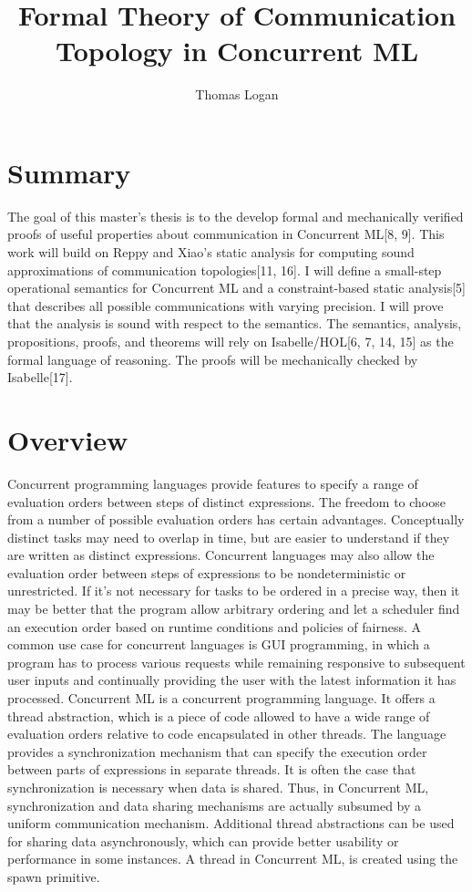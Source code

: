 \documentclass{article}
\title{Formal Theory of Communication Topology in Concurrent ML}
\author{Thomas Logan}
\begin{document}
\maketitle
{}

\newpage
{}


\section{Summary}
The goal of this master's thesis is to the develop formal and mechanically verified proofs of
useful properties about communication in Concurrent ML[8, 9].  This work will build on Reppy
and Xiao's static analysis for computing sound approximations of communication
topologies[11, 16].  I will define a small-step operational semantics for Concurrent ML and a
constraint-based static analysis[5] that describes all possible communications with varying
precision.  I will prove that the analysis is sound with respect to the semantics.  The
semantics, analysis, propositions, proofs, and theorems will rely on Isabelle/HOL[6, 7, 14, 15]
as the formal language of reasoning.  The proofs will be mechanically checked by Isabelle[17].


\section{Overview}
Concurrent programming languages provide features to specify a range of evaluation orders between steps of distinct expressions.  The freedom to choose from a number of possible evaluation orders has certain advantages.  Conceptually distinct tasks may need to overlap in time, but are easier to understand if they are written as distinct expressions.  Concurrent languages may also allow the evaluation order between steps of expressions to be nondeterministic or unrestricted.  If it's not necessary for tasks to be ordered in a precise way, then it may be better that the program allow arbitrary ordering and let a scheduler find an execution order based on runtime conditions and policies of fairness.  A common use case for concurrent languages is GUI programming, in which a program has to process various requests while remaining responsive to subsequent user inputs and continually providing the user with the latest information it has processed.
	Concurrent ML is a concurrent programming language.  It offers a thread abstraction, which is a piece of code allowed to have a wide range of evaluation orders relative to code encapsulated in other threads.  The language provides a synchronization mechanism that can specify the execution order between parts of expressions in separate threads.  It is often the case that synchronization is necessary when data is shared.  Thus, in Concurrent ML, synchronization and data sharing mechanisms are actually subsumed by a uniform communication mechanism.  Additional thread abstractions can be used for sharing data asynchronously, which can provide better usability or performance in some instances.  A thread in Concurrent ML, is created using the spawn primitive.
\end{document}
